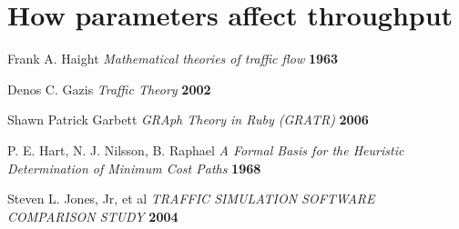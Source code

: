 \documentclass[11pt,a4paper]{article}
\begin{document}

\section{How parameters affect throughput}

\begin{thebibliography}{99}
 Frank A. Haight
{\it Mathematical theories of traffic flow} {\bf 1963}

 Denos C. Gazis
{\it Traffic Theory} {\bf 2002}

 Shawn Patrick Garbett
{\it GRAph Theory in Ruby (GRATR)} {\bf 2006}

 P. E. Hart, N. J. Nilsson, B. Raphael
{\it A Formal Basis for the Heuristic Determination of Minimum Cost Paths} {\bf 1968}

 Steven L. Jones, Jr, et al
{\it TRAFFIC SIMULATION SOFTWARE COMPARISON STUDY} {\bf 2004}

\end{thebibliography}
\end{document}
